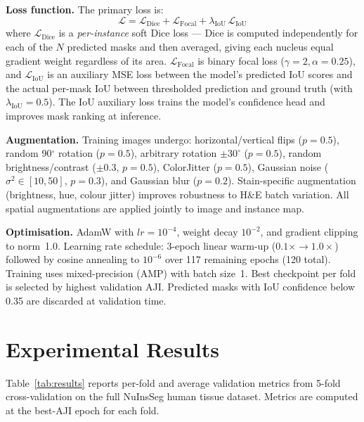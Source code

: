 \documentclass[10pt,twocolumn]{article}
\begin{document}
\textbf{Loss function.}
The primary loss is:
\begin{equation}
  \mathcal{L} = \mathcal{L}_{\text{Dice}} + \mathcal{L}_{\text{Focal}}
              + \lambda_{\text{IoU}}\,\mathcal{L}_{\text{IoU}}
\end{equation}
where $\mathcal{L}_{\text{Dice}}$ is a \emph{per-instance} soft
Dice loss --- Dice is computed independently for each of the $N$
predicted masks and then averaged, giving each nucleus equal
gradient weight regardless of its area. $\mathcal{L}_{\text{Focal}}$
is binary focal loss ($\gamma=2, \alpha=0.25$), and
$\mathcal{L}_{\text{IoU}}$ is an auxiliary MSE loss between the
model's predicted IoU scores and the actual per-mask IoU between
thresholded prediction and ground truth
(with $\lambda_{\text{IoU}}=0.5$). The IoU auxiliary loss trains
the model's confidence head and improves mask ranking at inference.

\textbf{Augmentation.}
Training images undergo: horizontal/vertical flips ($p=0.5$),
random 90$^\circ$ rotation ($p=0.5$), arbitrary rotation
$\pm30^\circ$ ($p=0.5$), random brightness/contrast
($\pm0.3$, $p=0.5$), ColorJitter ($p=0.5$), Gaussian noise
($\sigma^2\in[10,50]$, $p=0.3$), and Gaussian blur ($p=0.2$).
Stain-specific augmentation (brightness, hue, colour jitter)
improves robustness to H\&E batch variation. All spatial
augmentations are applied jointly to image and instance map.

\textbf{Optimisation.}
AdamW with $lr=10^{-4}$, weight decay $10^{-2}$, and gradient
clipping to norm~1.0. Learning rate schedule: 3-epoch linear
warm-up ($0.1\times \to 1.0\times$) followed by cosine
annealing to $10^{-6}$ over 117 remaining epochs (120 total).
Training uses mixed-precision (AMP) with batch size~1.
Best checkpoint per fold is selected by highest validation AJI.
Predicted masks with IoU confidence below 0.35 are discarded
at validation time.

\section{Experimental Results}

Table~\ref{tab:results} reports per-fold and average validation
metrics from 5-fold cross-validation on the full NuInsSeg human
tissue dataset. Metrics are computed at the best-AJI epoch for
each fold.
\end{document}
